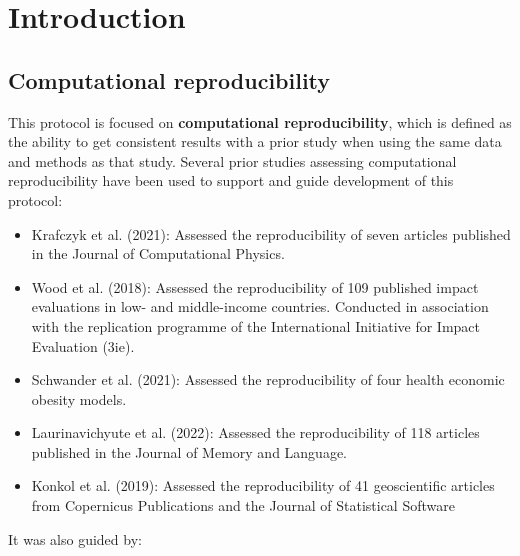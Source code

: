 \vspace{1cm}
\section{Introduction}

\subsection{Computational reproducibility}

This protocol is focused on \textbf{computational reproducibility}, which is defined as the ability to get consistent results with a prior study when using  the same data and methods as that study.\autocite{national_academies_of_sciences_engineering_and_medicine_reproducibility_2019} Several prior studies assessing computational reproducibility have been used to support and guide development of this protocol:

\begin{itemize}
    \item Krafczyk et al. (2021):\autocite{krafczyk_learning_2021} Assessed the reproducibility of seven articles published in the Journal of Computational Physics.
    \item Wood et al. (2018):\autocite{wood_push_2018,wood_replication_2018} Assessed the reproducibility of 109 published impact evaluations in low- and middle-income countries. Conducted in association with the replication programme of the International Initiative for Impact Evaluation (3ie).
    \item Schwander et al. (2021):\autocite{schwander_replication_2021} Assessed the reproducibility of four health economic obesity models.
    \item Laurinavichyute et al. (2022):\autocite{laurinavichyute_share_2022} Assessed the reproducibility of 118 articles published in the Journal of Memory and Language.
    \item Konkol et al. (2019):\autocite{konkol_computational_2019} Assessed the reproducibility of 41 geoscientific articles from Copernicus Publications and the Journal of Statistical Software
\end{itemize}

It was also guided by:

